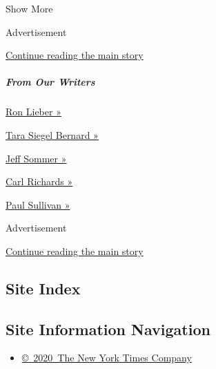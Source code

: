 Show More

Advertisement

\protect\hyperlink{after-mid1}{Continue reading the main story}

\hypertarget{from-our-writers}{%
\subparagraph{From Our Writers}\label{from-our-writers}}

\href{https://www.nytimes.com/by/ron-lieber}{Ron Lieber »}

\href{https://www.nytimes.com/by/tara-siegel-bernard}{Tara Siegel
Bernard »}

\href{https://www.nytimes.com/by/jeff-sommer}{Jeff Sommer »}

\href{https://www.nytimes.com/by/carl-richards}{Carl Richards »}

\href{https://www.nytimes.com/column/wealth-matters}{Paul Sullivan »}

Advertisement

\protect\hyperlink{after-mktg}{Continue reading the main story}

\hypertarget{site-index}{%
\subsection{Site Index}\label{site-index}}

\hypertarget{site-information-navigation}{%
\subsection{Site Information
Navigation}\label{site-information-navigation}}

\begin{itemize}
\tightlist
\item
  \href{https://help.nytimes.com/hc/en-us/articles/115014792127-Copyright-notice}{©~2020~The
  New York Times Company}
\end{itemize}

